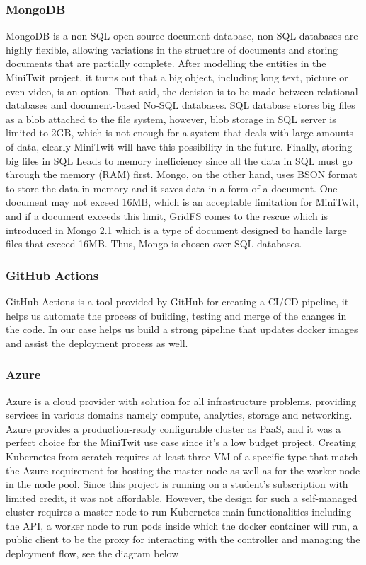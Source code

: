 \subsubsection{MongoDB}
MongoDB is a non SQL open-source document database, non SQL databases are highly flexible, allowing variations in the structure of documents and storing documents that are partially complete. After modelling the entities in the MiniTwit project, it turns out that a big object, including long text, picture or even video, is an option. That said, the decision is to be made between relational databases and document-based No-SQL databases. SQL database stores big files as a blob attached to the file system, however, blob storage in SQL server is limited to 2GB, which is not enough for a system that deals with large amounts of data, clearly MiniTwit will have this possibility in the future. Finally, storing big files in SQL Leads to memory inefficiency since all the data in SQL must go through the memory (RAM) first. Mongo, on the other hand, uses BSON format to store the data in memory and it saves data in a form of a document. One document may not exceed 16MB, which is an acceptable limitation for MiniTwit, and if a document exceeds this limit, GridFS comes to the rescue which is introduced in Mongo 2.1 which is a type of document designed to handle large files that exceed 16MB. Thus, Mongo is chosen over SQL databases.

\subsubsection{GitHub Actions}
GitHub Actions is a tool provided by GitHub for creating a CI/CD pipeline, it helps us automate the process of building, testing and merge of the changes in the code. In our case helps us build a strong pipeline that updates docker images and assist the deployment process as well.

\subsubsection{Azure}
Azure is a cloud provider with solution for all infrastructure problems, providing services in various domains namely compute, analytics, storage and networking. Azure provides a production-ready configurable cluster as PaaS, and it was a perfect choice for the MiniTwit use case since it's a low budget project. Creating Kubernetes from scratch requires at least three VM of a specific type that match the Azure requirement for hosting the master node as well as for the worker node in the node pool. Since this project is running on a student’s subscription with limited credit, it was not affordable. However, the design for such a self-managed cluster requires a master node to run Kubernetes main functionalities including the API, a worker node to run pods inside which the docker container will run, a public client to be the proxy for interacting with the controller and managing the deployment flow, see the diagram below

